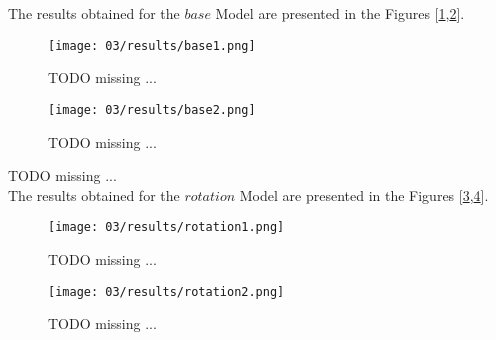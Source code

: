 The results obtained for the \(base\) Model are presented in the Figures [\ref{fig:CP_results_base1},\ref{fig:CP_results_base2}].

\begin{figure}[H]
  \centering
  \texttt{[image: 03/results/base1.png]}
  \caption{
    \colorbox{BurntOrange}{TODO missing ...}
  }
  \label{fig:CP_results_base1}
\end{figure}
\begin{figure}[H]
  \centering
  \texttt{[image: 03/results/base2.png]}
  \caption{
    \colorbox{BurntOrange}{TODO missing ...}
  }
  \label{fig:CP_results_base2}
\end{figure}

\colorbox{BurntOrange}{TODO missing ...} \\
The results obtained for the \(rotation\) Model are presented in the Figures [\ref{fig:CP_results_rotation1},\ref{fig:CP_results_rotation2}].

\begin{figure}[H]
  \centering
  \texttt{[image: 03/results/rotation1.png]}
  \caption{
    \colorbox{BurntOrange}{TODO missing ...}
  }
  \label{fig:CP_results_rotation1}
\end{figure}
\begin{figure}[H]
  \centering
  \texttt{[image: 03/results/rotation2.png]}
  \caption{
    \colorbox{BurntOrange}{TODO missing ...}
  }
  \label{fig:CP_results_rotation2}
\end{figure}


